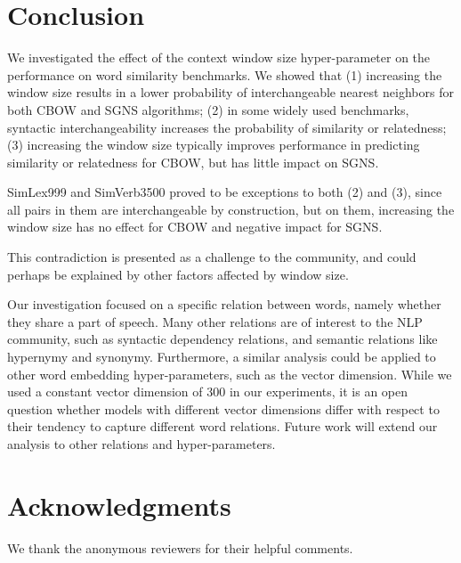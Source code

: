 \documentclass[11pt,a4paper]{article}
\begin{document}
    
    

\section{Conclusion}\label{sec:conclusion}

    We investigated the effect of the context window size hyper-parameter
    on the performance on word similarity benchmarks.
    We showed that
    (1) increasing the window size results in a lower probability of interchangeable
    nearest neighbors for both CBOW and SGNS algorithms;
    (2) in some widely used benchmarks,
    syntactic interchangeability increases the probability of similarity or relatedness;
    (3) increasing the window size typically improves performance
    in predicting similarity or relatedness for CBOW,
    but has little impact on SGNS.
    
    SimLex999 and SimVerb3500 proved to be exceptions to both (2) and (3),
    since all pairs in them are interchangeable by construction,
    but on them, increasing the window size has no effect for CBOW
    and negative impact for SGNS.
    
    This contradiction is presented as a challenge to the community,
    and could perhaps be explained by other factors affected by window size.
    
    Our investigation focused on a specific relation between words,
    namely whether they share a part of speech.
    Many other relations are of interest to the NLP
    community, such as syntactic dependency relations,
    and semantic relations like hypernymy and synonymy.
    Furthermore, a similar analysis could be applied to other word
    embedding hyper-parameters, such as the vector dimension.
    While we used a constant vector dimension of 300 in our experiments,
    it is an open question whether models with different vector dimensions
    differ with respect to their tendency to capture different word relations.
    Future work will extend our analysis to other relations and hyper-parameters.

\section*{Acknowledgments}

We thank the anonymous reviewers for their helpful comments.

    
    
    
\end{document}
